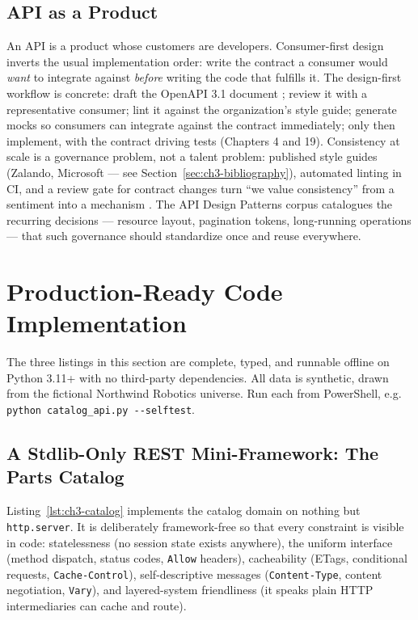 \subsection{API as a Product}
\label{sec:ch3-product}

An API is a product whose customers are developers. Consumer-first design
inverts the usual implementation order: write the contract a consumer would
\emph{want} to integrate against \emph{before} writing the code that fulfills
it. The design-first workflow is concrete: draft the OpenAPI 3.1 document
\cite{openapi31}; review it with a representative consumer; lint it against the
organization's style guide; generate mocks so consumers can integrate against
the contract immediately; only then implement, with the contract driving tests
(Chapters 4 and 19). Consistency at scale is a governance problem, not a talent
problem: published style guides (Zalando, Microsoft --- see
Section~\ref{sec:ch3-bibliography}), automated linting in CI, and a review gate
for contract changes turn ``we value consistency'' from a sentiment into a
mechanism \cite{gehl2021apidesign}. The API Design Patterns corpus
\cite{gehl2021apidesign} catalogues the recurring decisions --- resource layout,
pagination tokens, long-running operations --- that such governance should
standardize once and reuse everywhere.

\section{Production-Ready Code Implementation}
\label{sec:ch3-code}

The three listings in this section are complete, typed, and runnable offline on
Python 3.11+ with no third-party dependencies. All data is synthetic, drawn from
the fictional Northwind Robotics universe. Run each from PowerShell, e.g.
\texttt{python catalog\_api.py -{}-selftest}.

\subsection{A Stdlib-Only REST Mini-Framework: The Parts Catalog}

Listing~\ref{lst:ch3-catalog} implements the catalog domain on nothing but
\texttt{http.server}. It is deliberately framework-free so that every constraint
is visible in code: statelessness (no session state exists anywhere), the uniform
interface (method dispatch, status codes, \texttt{Allow} headers), cacheability
(ETags, conditional requests, \texttt{Cache-Control}), self-descriptive messages
(\texttt{Content-Type}, content negotiation, \texttt{Vary}), and layered-system
friendliness (it speaks plain HTTP intermediaries can cache and route).

